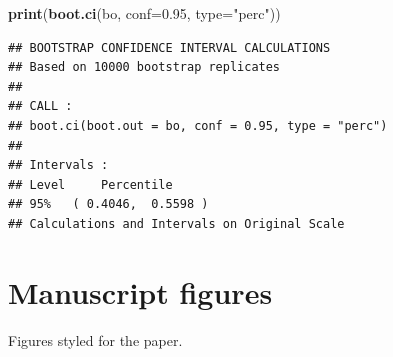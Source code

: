 \documentclass[]{book}
\newenvironment{Shaded}{\begin{snugshade}}{\end{snugshade}}
\newcommand{\DataTypeTok}[1]{\textcolor[rgb]{0.13,0.29,0.53}{#1}}
\newcommand{\FloatTok}[1]{\textcolor[rgb]{0.00,0.00,0.81}{#1}}
\newcommand{\KeywordTok}[1]{\textcolor[rgb]{0.13,0.29,0.53}{\textbf{#1}}}
\newcommand{\NormalTok}[1]{#1}
\newcommand{\StringTok}[1]{\textcolor[rgb]{0.31,0.60,0.02}{#1}}
\begin{document}
\begin{Shaded}
\begin{Highlighting}[]
\KeywordTok{print}\NormalTok{(}\KeywordTok{boot.ci}\NormalTok{(bo, }\DataTypeTok{conf=}\FloatTok{0.95}\NormalTok{, }\DataTypeTok{type=}\StringTok{"perc"}\NormalTok{))}
\end{Highlighting}
\end{Shaded}

\begin{verbatim}
## BOOTSTRAP CONFIDENCE INTERVAL CALCULATIONS
## Based on 10000 bootstrap replicates
## 
## CALL : 
## boot.ci(boot.out = bo, conf = 0.95, type = "perc")
## 
## Intervals : 
## Level     Percentile     
## 95%   ( 0.4046,  0.5598 )  
## Calculations and Intervals on Original Scale
\end{verbatim}

\hypertarget{manuscript-figures}{%
\section{Manuscript figures}\label{manuscript-figures}}

Figures styled for the paper.
\end{document}
